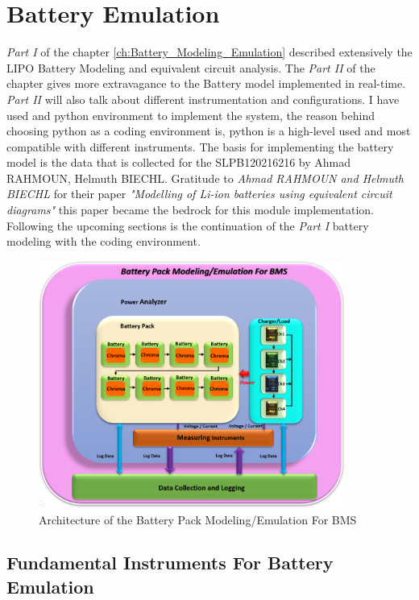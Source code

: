 \section{Battery Emulation}

\textit{Part I} of the chapter \ref{ch:Battery_Modeling_Emulation} described extensively the LIPO Battery Modeling and equivalent circuit analysis. The \textit{Part II} of the chapter gives more extravagance to the Battery model implemented in real-time. \textit{Part II} will also talk about different instrumentation and configurations. I have used and python environment to implement the system, the reason behind choosing python as a coding environment is, python is a high-level used and most compatible with different instruments. The basis for implementing the battery model is the data that is collected for the SLPB120216216 by Ahmad RAHMOUN, Helmuth BIECHL. Gratitude to \textit{Ahmad RAHMOUN and Helmuth BIECHL} for their paper\cite{UKEMPT_AHMAD2012} \textit{"Modelling of Li-ion batteries using equivalent circuit diagrams"} this paper became the bedrock for this module implementation. Following the upcoming sections is the continuation of the \textit{Part I} battery modeling with the coding environment.

\begin{figure}[h]
	\centering
	\includegraphics[width=0.9\textwidth]{Chap06/Figures/Battery_Pack_modeling_Architec.PNG}
	\caption{Architecture of the Battery Pack Modeling/Emulation For BMS}
	\label{fig:Battery_Pack_modeling_Architec}
\end{figure}

\subsection{Fundamental Instruments For Battery Emulation }

